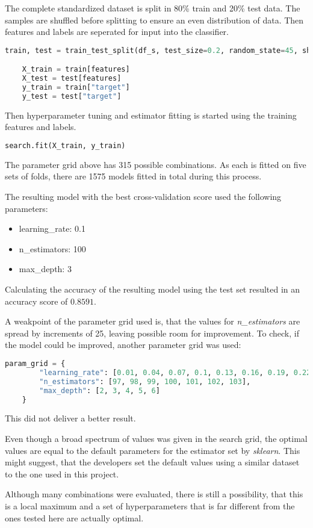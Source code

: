 The complete standardized dataset is split in 80\% train and 20\% test data.
The samples are shuffled before splitting to ensure an even distribution of data.
Then features and labels are seperated for input into the classifier.

\begin{lstlisting}[language=Python]
    train, test = train_test_split(df_s, test_size=0.2, random_state=45, shuffle=True)

    X_train = train[features]
    X_test = test[features]
    y_train = train["target"]
    y_test = test["target"]
\end{lstlisting}

Then hyperparameter tuning and estimator fitting is started using the training features and labels.

\begin{lstlisting}[language=Python]
    search.fit(X_train, y_train)
\end{lstlisting}

The parameter grid above has 315 possible combinations. As each is fitted on five sets of folds,
there are 1575 models fitted in total during this process.

The resulting model with the best cross-validation score used the following parameters:
\begin{itemize}
    \item learning\_rate: 0.1
    \item n\_estimators: 100
    \item max\_depth: 3
\end{itemize} 

Calculating the accuracy of the resulting model using the test set resulted in an accuracy score of $0.8591$.

A weakpoint of the parameter grid used is, that the values for \emph{n\_estimators} are spread by increments of 25,
leaving possible room for improvement.
To check, if the model could be improved, another parameter grid was used:

\begin{lstlisting}[language=Python]
    param_grid = {
        "learning_rate": [0.01, 0.04, 0.07, 0.1, 0.13, 0.16, 0.19, 0.22, 0.25],
        "n_estimators": [97, 98, 99, 100, 101, 102, 103],
        "max_depth": [2, 3, 4, 5, 6]
    }
\end{lstlisting}

This did not deliver a better result.

Even though a broad spectrum of values was given in the search grid, the optimal values 
are equal to the default parameters for the estimator set by \emph{sklearn}.
This might suggest, that the developers set the default values using a similar dataset to the one used in this project.

Although many combinations were evaluated, there is still a possibility, that this is a local 
maximum and a set of hyperparameters that is far different from the ones tested here are actually
optimal. 